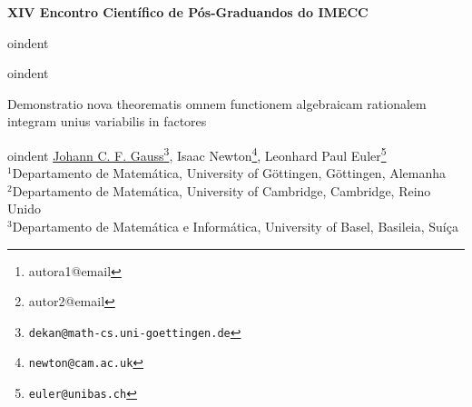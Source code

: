 \documentclass[a4paper, 12pt]{article}
\begin{document}
	\begin{center}
		\sc\large\textbf{XIV Encontro Científico de Pós-Graduandos do IMECC}\\
		\vspace{-1em}
		
oindent \hrulefill\\	
		\vspace{-1.1em}
		
oindent \hrulefill\\
	\end{center}
	\begin{center}
		\Large{Demonstratio nova theorematis omnem functionem algebraicam rationalem integram unius variabilis in factores}
	\end{center}
	\author{
		{\large  Nome da Autora }\thanks{autora1@email}\\
		{\small Filiação da autora} \\
		{\large Nome do Autor }\thanks{autor2@email} \\
		{\small Filiação do autor } \\
	}
	
	
oindent {\small 
	\underline{Johann C. F. Gauss}\footnote{\texttt{dekan@math-cs.uni-goettingen.de}},
	Isaac Newton\footnote{\texttt{newton@cam.ac.uk}},
	Leonhard Paul Euler\footnote{\texttt{euler@unibas.ch}}}\\
	{\footnotesize
	$^{1}$Departamento de Matemática, University of G\"{o}ttingen, G\"{o}ttingen, Alemanha\\ 
	$^{2}$Departamento de Matemática, University of Cambridge, Cambridge, Reino Unido\\
	$^{3}$Departamento de Matemática e Informática, University of Basel, Basileia, Suíça}
	\begin{abstract}
	\lipsum[1]
	
	
oindent {\bf Palavras-chave}:   %
	\end{abstract}
\end{document}
